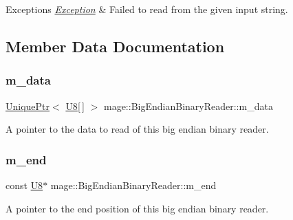 \begin{DoxyExceptions}{Exceptions}
{\em \mbox{\hyperlink{classmage_1_1_exception}{Exception}}} & Failed to read from the given input string. \\
\hline
\end{DoxyExceptions}


\subsection{Member Data Documentation}
\mbox{\label{classmage_1_1_big_endian_binary_reader_a54128bdaa233c1bd20494189b2397fe3}} 
\subsubsection{\texorpdfstring{m\+\_\+data}{m\_data}}
{\footnotesize\ttfamily \mbox{\hyperlink{namespacemage_a3316d7143a973e37adf1110f2e80ca31}{Unique\+Ptr}}$<$ \mbox{\hyperlink{namespacemage_afc638980bc6154f15af5e2d93a0e0ea9}{U8}}\mbox{[}$\,$\mbox{]} $>$ mage\+::\+Big\+Endian\+Binary\+Reader\+::m\+\_\+data\hspace{0.3cm}{\ttfamily [private]}}

A pointer to the data to read of this big endian binary reader. \mbox{\label{classmage_1_1_big_endian_binary_reader_ab4f707d30799b98afed0f9adfc27a3e2}} 
\subsubsection{\texorpdfstring{m\+\_\+end}{m\_end}}
{\footnotesize\ttfamily const \mbox{\hyperlink{namespacemage_afc638980bc6154f15af5e2d93a0e0ea9}{U8}}$\ast$ mage\+::\+Big\+Endian\+Binary\+Reader\+::m\+\_\+end\hspace{0.3cm}{\ttfamily [private]}}

A pointer to the end position of this big endian binary reader. \mbox{\label{classmage_1_1_big_endian_binary_reader_a4b8ac6558a16e53ee52c8a81b5b43b91}} 
